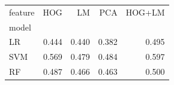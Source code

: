 \begin{tabular}{lrrrr}
\toprule
feature & HOG & LM & PCA & HOG+LM \\
model &  &  &  &  \\
\midrule
LR & 0.444 & 0.440 & 0.382 & 0.495 \\
SVM & 0.569 & 0.479 & 0.484 & 0.597 \\
RF & 0.487 & 0.466 & 0.463 & 0.500 \\
\bottomrule
\end{tabular}
